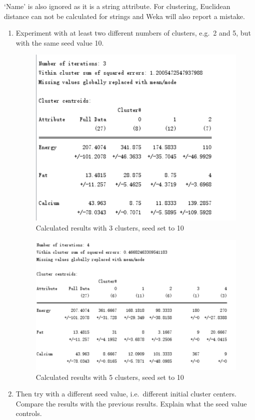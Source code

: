 \documentclass[
]{article}
\begin{document}
`Name' is also ignored as it is a string attribute. For clustering,
Euclidean distance can not be calculated for strings and Weka will also
report a mistake.

\begin{enumerate}
\def\labelenumi{\arabic{enumi})}
\setcounter{enumi}{1}
\item
  Experiment with at least two different numbers of clusters, e.g.~2 and
  5, but with the same seed value 10.

  \begin{figure}
  \centering
  \includegraphics[width=5.20833in,height=\textheight]{Pictures/2.png}
  \caption{Calculated results with 3 clusters, seed set to 10}
  \end{figure}

  \begin{figure}
  \centering
  \includegraphics[width=6.25in,height=\textheight]{Pictures/3.png}
  \caption{Calculated results with 5 clusters, seed set to 10}
  \end{figure}
\item
  Then try with a different seed value, i.e.~different initial cluster
  centers. Compare the results with the previous results. Explain what
  the seed value controls.


\end{enumerate}
\end{document}
